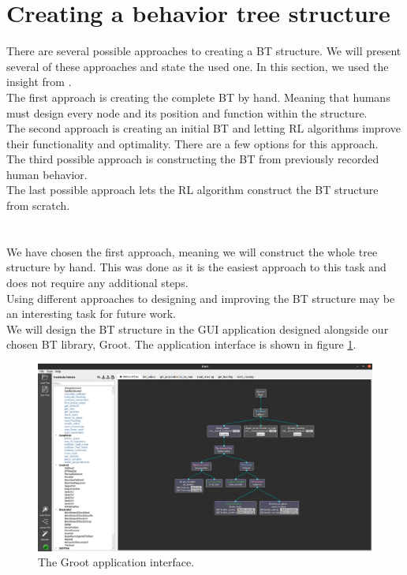 \section{Creating a behavior tree structure}
    There are several possible approaches to creating a BT structure. We will present several of these approaches and state the used one. In this section, we used the insight from \cite{BT_creation}.\\
    The first approach is creating the complete BT by hand. Meaning that humans must design every node and its position and function within the structure.\\
    The second approach is creating an initial BT and letting RL algorithms improve their functionality and optimality. There are a few options for this approach.\\
    The third possible approach is constructing the BT from previously recorded human behavior.\\
    The last possible approach lets the RL algorithm construct the BT structure from scratch.\\\\
    \\
    We have chosen the first approach, meaning we will construct the whole tree structure by hand. This was done as it is the easiest approach to this task and does not require any additional steps.\\
    Using different approaches to designing and improving the BT structure may be an interesting task for future work.\\
    We will design the BT structure in the GUI application designed alongside our chosen BT library, Groot. The application interface is shown in figure \ref{fig:groot}.
    \begin{figure}[ht]
        \centering
        \includegraphics[width=\linewidth]{images/Groot.png}
        \caption{The Groot application interface.}
        \label{fig:groot}
    \end{figure}

